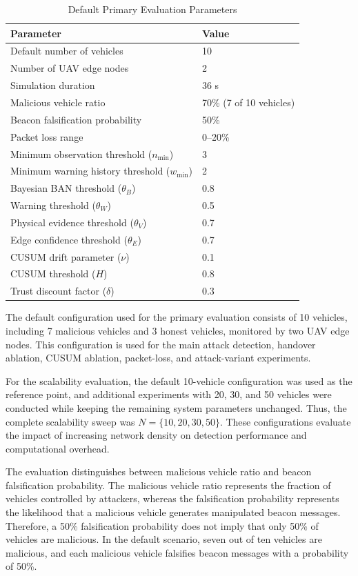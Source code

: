 \documentclass[journal]{IEEEtran}
\begin{document}
\begin{table}[!t]
\caption{Default Primary Evaluation Parameters}
\label{tab:parameters}
\centering
\begin{tabular}{ll}
\toprule
Parameter & Value\\
\midrule
Default number of vehicles & 10\\
Number of UAV edge nodes & 2\\
Simulation duration & 36 s\\
Malicious vehicle ratio & 70\% (7 of 10 vehicles)\\
Beacon falsification probability & 50\%\\
Packet loss range & 0--20\%\\
Minimum observation threshold ($n_{\min}$) & 3\\
Minimum warning history threshold ($w_{\min}$) & 2\\
Bayesian BAN threshold ($\theta_B$) & 0.8\\
Warning threshold ($\theta_W$) & 0.5\\
Physical evidence threshold ($\theta_V$) & 0.7\\
Edge confidence threshold ($\theta_E$) & 0.7\\
CUSUM drift parameter ($\nu$) & 0.1\\
CUSUM threshold ($H$) & 0.8\\
Trust discount factor ($\delta$) & 0.3\\
\bottomrule
\end{tabular}
\end{table}

The default configuration used for the primary evaluation consists of
10 vehicles, including 7 malicious vehicles and 3 honest vehicles,
monitored by two UAV edge nodes. This configuration is used for the
main attack detection, handover ablation, CUSUM ablation, packet-loss,
and attack-variant experiments.

For the scalability evaluation, the default 10-vehicle configuration was
used as the reference point, and additional experiments with 20, 30, and
50 vehicles were conducted while keeping the remaining system parameters
unchanged. Thus, the complete scalability sweep was
$N=\{10,20,30,50\}$. These configurations evaluate the impact of increasing
network density on detection performance and computational overhead.

The evaluation distinguishes between malicious vehicle ratio and beacon
falsification probability. The malicious vehicle ratio represents the
fraction of vehicles controlled by attackers, whereas the falsification
probability represents the likelihood that a malicious vehicle generates
manipulated beacon messages. Therefore, a 50\% falsification probability
does not imply that only 50\% of vehicles are malicious. In the default
scenario, seven out of ten vehicles are malicious, and each malicious
vehicle falsifies beacon messages with a probability of 50\%.
\end{document}
